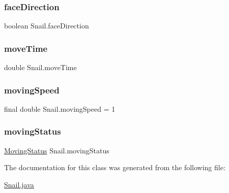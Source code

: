 \subsubsection{\texorpdfstring{face\+Direction}{faceDirection}}
{\footnotesize\ttfamily boolean Snail.\+face\+Direction\hspace{0.3cm}{\ttfamily [private]}}

\mbox{\label{class_snail_a4d00c96144349b1f5e42c32cdd47d254}} 
\subsubsection{\texorpdfstring{move\+Time}{moveTime}}
{\footnotesize\ttfamily double Snail.\+move\+Time\hspace{0.3cm}{\ttfamily [private]}}

\mbox{\label{class_snail_a1d4e4fdcaa64b8ed111cdaf5536be80f}} 
\subsubsection{\texorpdfstring{moving\+Speed}{movingSpeed}}
{\footnotesize\ttfamily final double Snail.\+moving\+Speed = 1\hspace{0.3cm}{\ttfamily [private]}}

\mbox{\label{class_snail_ac89d7ec73d68b4c98583d1eaca4038e9}} 
\subsubsection{\texorpdfstring{moving\+Status}{movingStatus}}
{\footnotesize\ttfamily \mbox{\hyperlink{enum_moving_object_1_1_moving_status}{Moving\+Status}} Snail.\+moving\+Status\hspace{0.3cm}{\ttfamily [private]}}



The documentation for this class was generated from the following file\+:\begin{DoxyCompactItemize}
\item 
\mbox{\hyperlink{_snail_8java}{Snail.\+java}}\end{DoxyCompactItemize}
